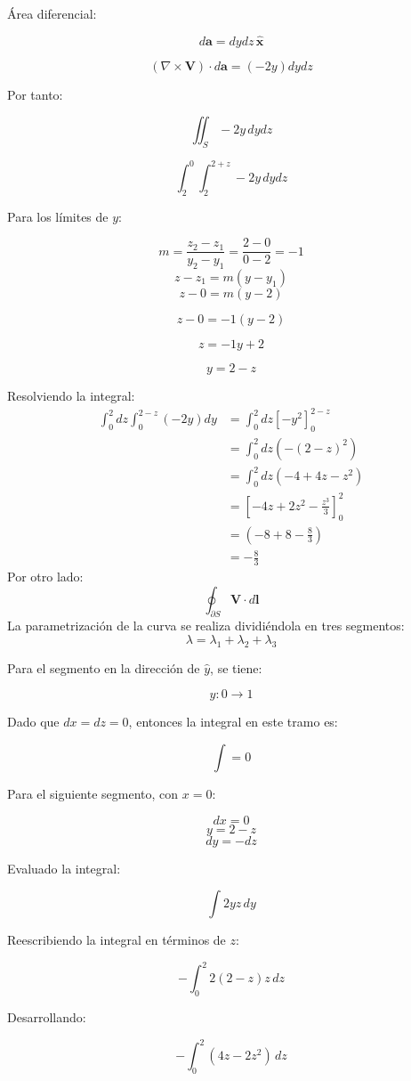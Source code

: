 \documentclass[12pt]{article}
\begin{document}
Área diferencial:

\[
d\mathbf{a} = dy dz \, \hat{\mathbf{x}}
\]

\[
(\nabla \times \mathbf{V}) \cdot d\mathbf{a} = (-2y) dy dz
\]

Por tanto:

\[
\iint_S -2y \, dy dz
\]

\[
\int_2^0 \int_2^{2+z} -2y \, dy dz
\]

Para los límites de \( y \):

\[
m = \frac{z_2 - z_1}{y_2 - y_1} = \frac{2 - 0}{0 - 2} = -1
\]
\[
 z- z_1=m({y - y_1} )
\]
\[
z - 0 = m(y - 2)
\]

\[
z - 0 = -1(y - 2)
\]

\[
z = -1y + 2
\]

\[
y = 2 - z
\]

Resolviendo la integral:
\begin{align*}
    \int_0^2 dz \int_0^{2-z} (-2y) dy &= \int_0^2 dz \left[ -y^2 \right]_0^{2-z} \\
    &= \int_0^2 dz \left( - (2-z)^2 \right) \\
    &= \int_0^2 dz (-4 + 4z - z^2) \\
    &= \left[ -4z + 2z^2 - \frac{z^3}{3} \right]_0^2 \\
    &= \left( -8 + 8 - \frac{8}{3} \right) \\
    &=\boxed{ -\frac{8}{3}}
\end{align*}
Por otro lado:
\[
\oint_{\partial S} \mathbf{V} \cdot d\mathbf{l} 
\] 
La parametrización de la curva se realiza dividiéndola en tres segmentos:
\[
\lambda = \lambda_1 + \lambda_2 + \lambda_3
\]


Para el segmento en la dirección de $\hat{y}$, se tiene:

\[
y: 0 \to 1
\]

Dado que $dx = dz = 0$, entonces la integral en este tramo es:

\[
\int = 0
\]

Para el siguiente segmento, con $x = 0$:

\[
dx = 0
\]
\[
y = 2 - z
\]
\[
dy = -dz
\]

Evaluado la integral:

\[
\int 2 yz \, dy
\]

Reescribiendo la integral en términos de $z$:

\[
-\int_0^2 2(2 - z)z \, dz
\]

Desarrollando:

\[
-\int_0^2 (4z - 2z^2) \, dz
\]
\end{document}
